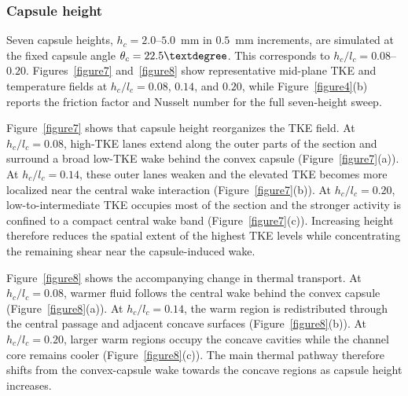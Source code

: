 \documentclass[energies,article,submit,moreauthors,noheaderline]{Definitions/mdpi}
\newcommand{\degree}{\texorpdfstring{\ensuremath{^\circ}}{\textdegree}}
\def\ensuremath#1{}%
\def\degree{\textdegree}%
\begin{document}
\subsubsection{Capsule height}
\label{sec:disc_capsule_height}

Seven capsule heights, $h_c=2.0$--$5.0$~mm in $0.5$~mm increments, are simulated at the fixed capsule angle $\theta_c=22.5\degree$. This corresponds to $h_c/l_c=0.08$--$0.20$. Figures~\ref{figure7} and~\ref{figure8} show representative mid-plane TKE and temperature fields at $h_c/l_c=0.08$, $0.14$, and $0.20$, while Figure~\ref{figure4}(b) reports the friction factor and Nusselt number for the full seven-height sweep.



Figure~\ref{figure7} shows that capsule height reorganizes the TKE field. At $h_c/l_c=0.08$, high-TKE lanes extend along the outer parts of the section and surround a broad low-TKE wake behind the convex capsule (Figure~\ref{figure7}(a)). At $h_c/l_c=0.14$, these outer lanes weaken and the elevated TKE becomes more localized near the central wake interaction (Figure~\ref{figure7}(b)). At $h_c/l_c=0.20$, low-to-intermediate TKE occupies most of the section and the stronger activity is confined to a compact central wake band (Figure~\ref{figure7}(c)). Increasing height therefore reduces the spatial extent of the highest TKE levels while concentrating the remaining shear near the capsule-induced wake.



Figure~\ref{figure8} shows the accompanying change in thermal transport. At $h_c/l_c=0.08$, warmer fluid follows the central wake behind the convex capsule (Figure~\ref{figure8}(a)). At $h_c/l_c=0.14$, the warm region is redistributed through the central passage and adjacent concave surfaces (Figure~\ref{figure8}(b)). At $h_c/l_c=0.20$, larger warm regions occupy the concave cavities while the channel core remains cooler (Figure~\ref{figure8}(c)). The main thermal pathway therefore shifts from the convex-capsule wake towards the concave regions as capsule height increases.
\end{document}
